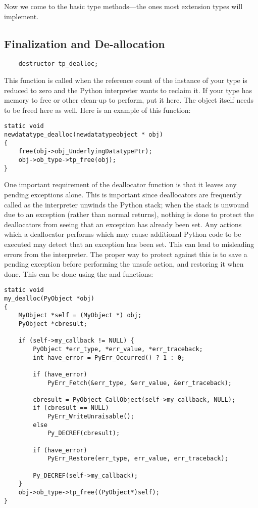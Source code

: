 Now we come to the basic type methods---the ones most extension types
will implement.


\subsection{Finalization and De-allocation}


\begin{verbatim}
    destructor tp_dealloc;
\end{verbatim}

This function is called when the reference count of the instance of
your type is reduced to zero and the Python interpreter wants to
reclaim it.  If your type has memory to free or other clean-up to
perform, put it here.  The object itself needs to be freed here as
well.  Here is an example of this function:

\begin{verbatim}
static void
newdatatype_dealloc(newdatatypeobject * obj)
{
    free(obj->obj_UnderlyingDatatypePtr);
    obj->ob_type->tp_free(obj);
}
\end{verbatim}

One important requirement of the deallocator function is that it
leaves any pending exceptions alone.  This is important since
deallocators are frequently called as the interpreter unwinds the
Python stack; when the stack is unwound due to an exception (rather
than normal returns), nothing is done to protect the deallocators from
seeing that an exception has already been set.  Any actions which a
deallocator performs which may cause additional Python code to be
executed may detect that an exception has been set.  This can lead to
misleading errors from the interpreter.  The proper way to protect
against this is to save a pending exception before performing the
unsafe action, and restoring it when done.  This can be done using the
 and
 functions:

\begin{verbatim}
static void
my_dealloc(PyObject *obj)
{
    MyObject *self = (MyObject *) obj;
    PyObject *cbresult;

    if (self->my_callback != NULL) {
        PyObject *err_type, *err_value, *err_traceback;
        int have_error = PyErr_Occurred() ? 1 : 0;

        if (have_error)
            PyErr_Fetch(&err_type, &err_value, &err_traceback);

        cbresult = PyObject_CallObject(self->my_callback, NULL);
        if (cbresult == NULL)
            PyErr_WriteUnraisable();
        else
            Py_DECREF(cbresult);

        if (have_error)
            PyErr_Restore(err_type, err_value, err_traceback);

        Py_DECREF(self->my_callback);
    }
    obj->ob_type->tp_free((PyObject*)self);
}
\end{verbatim}


